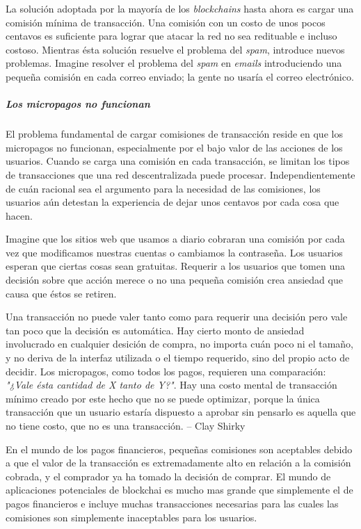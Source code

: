 \documentclass[a4paper,titlepage,final]{article}
\begin{document}
La solución adoptada por la mayoría de los \textit{blockchains} hasta ahora es cargar una comisión mínima de transacción. Una comisión con un costo de unos pocos centavos es suficiente para lograr que atacar la red no sea redituable e incluso costoso. Mientras ésta solución resuelve el problema del \textit{spam}, introduce nuevos problemas. Imagine resolver el problema del \textit{spam} en \textit{emails} introduciendo una pequeña comisión en cada correo enviado; la gente no usaría el correo electrónico.

\subparagraph{Los micropagos no funcionan}

El problema fundamental de cargar comisiones de transacción reside en que los micropagos no funcionan, especialmente por el bajo valor de las acciones de los usuarios. Cuando se carga una comisión en cada transacción, se limitan los tipos de transacciones que una red descentralizada puede procesar. Independientemente de cuán racional sea el argumento para la necesidad de las comisiones, los usuarios aún detestan la experiencia de dejar unos centavos por cada cosa que hacen.

Imagine que los sitios web que usamos a diario cobraran una comisión por cada vez que modificamos nuestras cuentas o cambiamos la contraseña. Los usuarios esperan que ciertas cosas sean gratuitas. Requerir a los usuarios que tomen una decisión sobre que acción merece o no una pequeña comisión crea ansiedad que causa que éstos se retiren.

\begin{displayquote}
Una transacción no puede valer tanto como para requerir una decisión pero vale tan poco que la decisión es automática. Hay cierto monto de ansiedad involucrado en cualquier desición de compra, no importa cuán poco ni el tamaño, y no deriva de la interfaz utilizada o el tiempo requerido, sino del propio acto de decidir. Los micropagos, como todos los pagos, requieren una comparación: \textit{"¿Vale ésta cantidad de X tanto de Y?"}. Hay una costo mental de transacción mínimo creado por este hecho que no se puede optimizar, porque la única transacción que un usuario estaría dispuesto a aprobar sin pensarlo es aquella que no tiene costo, que no es una transacción. – Clay Shirky \cite{8}
\end{displayquote}

En el mundo de los pagos financieros, pequeñas comisiones son aceptables debido a que el valor de la transacción es extremadamente alto en relación a la comisión cobrada, y el comprador ya ha tomado la decisión de comprar. El mundo de aplicaciones potenciales de blockchai es mucho mas grande que simplemente el de pagos financieros e incluye muchas transacciones necesarias para las cuales las comisiones son simplemente inaceptables para los usuarios.
\end{document}
